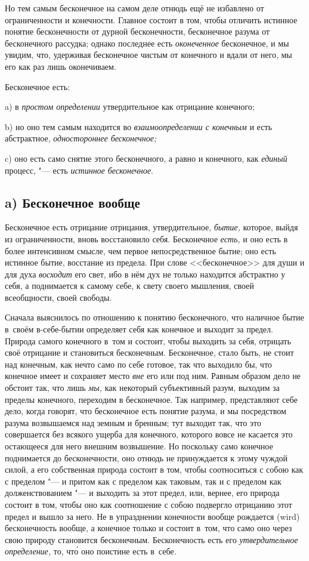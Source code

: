 Но тем самым бесконечное на самом деле отнюдь ещё не избавлено от
ограниченности и конечности. Главное состоит в том, чтобы отличить истинное
понятие бесконечности от дурной бесконечности, бесконечное разума от
бесконечного рассудка; однако последнее есть {\em оконеченное} бесконечное, и
мы увидим, что, удерживая бесконечное чистым от конечного и вдали от него, мы
его как раз лишь оконечиваем.

Бесконечное есть:

a) в {\em простом определении} утвердительное как отрицание конечного;

b) но оно тем самым находится во {\em взаимоопределении
с конечным} и есть абстрактное, {\em одностороннее бесконечное;}

c) оно есть само снятие этого бесконечного, а равно и конечного, как
{\em единый} процесс, "--- есть {\em истинное бесконечное}.

\subsection[a) Бесконечное вообще]{a) Бесконечное вообще}

Бесконечное есть отрицание отрицания, утвердительное,
{\em бытие,} которое, выйдя из ограниченности, вновь
восстановило себя. Бесконечное {\em есть,} и оно есть в
более интенсивном смысле, чем первое непосредственное бытие; оно есть
истинное бытие, восстание из предела. При слове <<бесконечное>> для души и
для духа {\em восходит} его свет, ибо в нём дух не
только находится абстрактно у себя, а поднимается к самому себе, к свету
своего мышления, своей всеобщности, своей свободы.

Сначала выяснилось по отношению к понятию бесконечного, что наличное бытие
в~своём в-себе-бытии определяет себя как конечное и выходит за предел. Природа
самого конечного в~том и состоит, чтобы выходить за себя, отрицать своё
отрицание и становиться бесконечным. Бесконечное, стало быть, не стоит над
конечным, как нечто само по себе готовое, так что выходило бы, что конечное
имеет и сохраняет место {\em вне} его или под ним. Равным образом дело не
обстоит так, что лишь {\em мы,} как некоторый субъективный разум, выходим за
пределы конечного, переходим в бесконечное. Так например, представляют себе
дело, когда говорят, что бесконечное есть понятие разума, и мы посредством
разума возвышаемся над земным и бренным; тут выходит так, что это совершается
без всякого ущерба для конечного, которого вовсе не касается это остающееся для
него внешним возвышение. Но поскольку само конечное поднимается до
бесконечности, оно отнюдь не принуждается к этому чуждой силой, а его
собственная природа состоит в том, чтобы соотноситься с собою как с пределом
"--- и притом как с пределом как таковым, так и с пределом как долженствованием
"--- и выходить за этот предел, или, вернее, его природа состоит в том, чтобы
оно как соотношение с собою подвергло отрицанию этот предел и вышло за него. Не
в упразднении конечности вообще рождается (wird) бесконечность вообще, а
конечное только и состоит в~том, что само оно через свою природу становится
бесконечным. Бесконечность есть его {\em утвердительное определение,}
то, чт\'{о} оно поистине есть в~себе.

